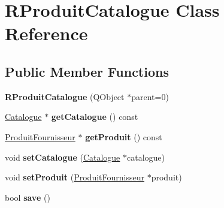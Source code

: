 \hypertarget{class_r_produit_catalogue}{
\section{RProduitCatalogue Class Reference}
\label{class_r_produit_catalogue}
}
\subsection*{Public Member Functions}
\begin{DoxyCompactItemize}
\item 
\hypertarget{class_r_produit_catalogue_a9986c1b5f3cf94cbf5d90b31efce6bf2}{
{\bfseries RProduitCatalogue} (QObject $\ast$parent=0)}
\label{class_r_produit_catalogue_a9986c1b5f3cf94cbf5d90b31efce6bf2}

\item 
\hypertarget{class_r_produit_catalogue_a3ef4c1fdbf2f726b0694535a7246a50a}{
\hyperlink{class_catalogue}{Catalogue} $\ast$ {\bfseries getCatalogue} () const }
\label{class_r_produit_catalogue_a3ef4c1fdbf2f726b0694535a7246a50a}

\item 
\hypertarget{class_r_produit_catalogue_ab148856d056e2602592404b251f9bd86}{
\hyperlink{class_produit_fournisseur}{ProduitFournisseur} $\ast$ {\bfseries getProduit} () const }
\label{class_r_produit_catalogue_ab148856d056e2602592404b251f9bd86}

\item 
\hypertarget{class_r_produit_catalogue_a6696217f8287d400cb21c93399c69605}{
void {\bfseries setCatalogue} (\hyperlink{class_catalogue}{Catalogue} $\ast$catalogue)}
\label{class_r_produit_catalogue_a6696217f8287d400cb21c93399c69605}

\item 
\hypertarget{class_r_produit_catalogue_a6b0599536fe27bd99bc99089a1c750a4}{
void {\bfseries setProduit} (\hyperlink{class_produit_fournisseur}{ProduitFournisseur} $\ast$produit)}
\label{class_r_produit_catalogue_a6b0599536fe27bd99bc99089a1c750a4}

\item 
\hypertarget{class_r_produit_catalogue_a8e93f5ce0b3ebccac36eb23041e59fdb}{
bool {\bfseries save} ()}
\label{class_r_produit_catalogue_a8e93f5ce0b3ebccac36eb23041e59fdb}

\end{DoxyCompactItemize}
